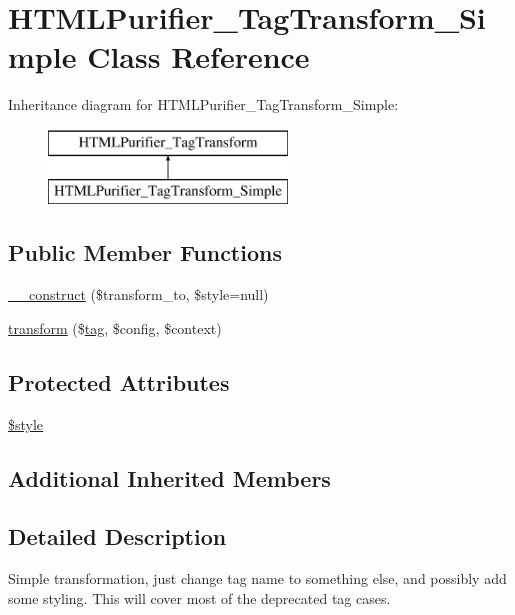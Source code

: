 \hypertarget{classHTMLPurifier__TagTransform__Simple}{\section{H\+T\+M\+L\+Purifier\+\_\+\+Tag\+Transform\+\_\+\+Simple Class Reference}
\label{classHTMLPurifier__TagTransform__Simple}
}
Inheritance diagram for H\+T\+M\+L\+Purifier\+\_\+\+Tag\+Transform\+\_\+\+Simple\+:\begin{figure}[H]
\begin{center}
\leavevmode
\includegraphics[height=2.000000cm]{classHTMLPurifier__TagTransform__Simple}
\end{center}
\end{figure}
\subsection*{Public Member Functions}
\begin{DoxyCompactItemize}
\item 
\hyperlink{classHTMLPurifier__TagTransform__Simple_ad8024901888a852238e2f6094a42d752}{\+\_\+\+\_\+construct} (\$transform\+\_\+to, \$style=null)
\item 
\hyperlink{classHTMLPurifier__TagTransform__Simple_a8cf42ce4bce31c491eb860d4527e1786}{transform} (\$\hyperlink{classtag}{tag}, \$config, \$context)
\end{DoxyCompactItemize}
\subsection*{Protected Attributes}
\begin{DoxyCompactItemize}
\item 
\hyperlink{classHTMLPurifier__TagTransform__Simple_ae78b6f004ece32e96cd7bedbe5f02e5c}{\$style}
\end{DoxyCompactItemize}
\subsection*{Additional Inherited Members}


\subsection{Detailed Description}
Simple transformation, just change tag name to something else, and possibly add some styling. This will cover most of the deprecated tag cases. 

